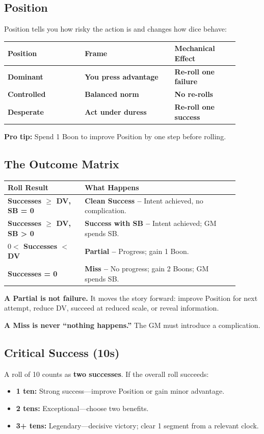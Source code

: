 \documentclass[10pt]{article}
\begin{document}
\subsection{Position}
Position tells you how risky the action is and changes how dice behave:
\begin{coretable}
\begin{tabular}{>{\bfseries}p{0.3\linewidth} >{\bfseries}p{0.35\linewidth} >{\bfseries}p{0.25\linewidth}}
\toprule
\textbf{Position} & \textbf{Frame} & \textbf{Mechanical Effect} \\
\midrule
Dominant & You press advantage & Re-roll one failure \\
Controlled & Balanced norm & No re-rolls \\
Desperate & Act under duress & Re-roll one success \\
\bottomrule
\end{tabular}
\end{coretable}
\textbf{Pro tip:} Spend 1 Boon to improve Position by one step before rolling.

\subsection{The Outcome Matrix}
\begin{coretable}
\begin{tabular}{>{\bfseries}p{0.3\linewidth} p{0.6\linewidth}}
\toprule
\textbf{Roll Result} & \textbf{What Happens} \\
\midrule
Successes $\ge$ DV, SB = 0 & \textbf{Clean Success –} Intent achieved, no complication. \\
Successes $\ge$ DV, SB > 0 & \textbf{Success with SB –} Intent achieved; GM spends SB. \\
$0 <$ Successes $<$ DV & \textbf{Partial –} Progress; gain 1 Boon. \\
Successes = 0 & \textbf{Miss –} No progress; gain 2 Boons; GM spends SB. \\
\bottomrule
\end{tabular}
\end{coretable}

\textbf{A Partial is not failure.} It moves the story forward: improve Position for next attempt, reduce DV, succeed at reduced scale, or reveal information.

\textbf{A Miss is never ``nothing happens.''} The GM must introduce a complication.

\subsection{Critical Success (10s)}
A roll of 10 counts as \textbf{two successes}. If the overall roll succeeds:
\begin{itemize}
    \item \textbf{1 ten:} Strong success—improve Position or gain minor advantage.
    \item \textbf{2 tens:} Exceptional—choose two benefits.
    \item \textbf{3+ tens:} Legendary—decisive victory; clear 1 segment from a relevant clock.
\end{itemize}
\end{document}
